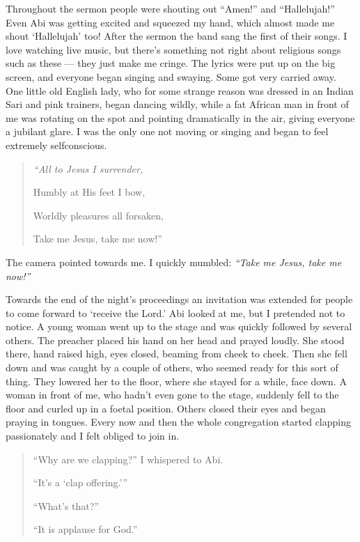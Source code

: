 \documentclass[12pt]{memoir}
\begin{document}
Throughout the sermon people were shouting out “Amen!” and “Hallelujah!”
Even Abi was getting excited and squeezed my hand,
which almost made me shout ‘Hallelujah’ too!
After the sermon the band sang the first of their songs.
I love watching live music,
but there’s something not right about religious songs such as these —
they just make me cringe.
The lyrics were put up on the big screen,
and everyone began singing and swaying.
Some got very carried away.
One little old English lady,
who for some strange reason was dressed in an Indian Sari and pink trainers,
began dancing wildly, while a fat African man in front of me
was rotating on the spot and pointing dramatically in the air,
giving everyone a jubilant glare.
I was the only one not moving or singing
and began to feel extremely self\–conscious.

\begin{quote}
\itshape
“All to Jesus I surrender,

Humbly at His feet I bow,

Worldly pleasures all forsaken,

Take me Jesus, take me now!”
\end{quote}

The camera pointed towards me.
I quickly mumbled: \emph{“Take me Jesus, take me now!”}

Towards the end of the night’s proceedings an invitation was extended
for people to come forward to ‘receive the Lord.’
Abi looked at me, but I pretended not to notice.
A young woman went up to the stage and was quickly followed by several others.
The preacher placed his hand on her head and prayed loudly.
She stood there, hand raised high, eyes closed, beaming from cheek to cheek.
Then she fell down and was caught by a couple of others,
who seemed ready for this sort of thing.
They lowered her to the floor, where she stayed for a while, face down.
A woman in front of me, who hadn’t even gone to the stage,
suddenly fell to the floor and curled up in a foetal position.
Others closed their eyes and began praying in tongues.
Every now and then the whole congregation started clapping passionately
and I felt obliged to join in.

\begin{quote}
“Why are we clapping?” I whispered to Abi.

“It’s a ‘clap offering.’”

“What’s that?”

“It is applause for God.”
\end{quote}
\end{document}
